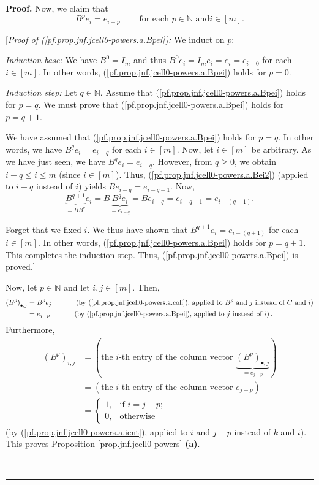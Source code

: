 \documentclass[numbers=enddot,12pt,final,onecolumn,notitlepage]{scrartcl}%
\numberwithin{exer}{subsection}
\theoremstyle{definition}
\newenvironment{proof}[1][Proof]{\noindent\textbf{#1.} }{\ \rule{0.5em}{0.5em}}
\begin{document}
\begin{proof}
Now, we claim that%
\begin{equation}
B^{p}e_{i}=e_{i-p}\ \ \ \ \ \ \ \ \ \ \text{for each }p\in\mathbb{N}\text{ and
}i\in\left[  m\right]  . \label{pf.prop.jnf.jcell0-powers.a.Bpei}%
\end{equation}


[\textit{Proof of (\ref{pf.prop.jnf.jcell0-powers.a.Bpei}):} We induct on $p$:

\textit{Induction base:} We have $B^{0}=I_{m}$ and thus $B^{0}e_{i}=I_{m}%
e_{i}=e_{i}=e_{i-0}$ for each $i\in\left[  m\right]  $. In other words,
(\ref{pf.prop.jnf.jcell0-powers.a.Bpei}) holds for $p=0$.

\textit{Induction step:} Let $q\in\mathbb{N}$. Assume that
(\ref{pf.prop.jnf.jcell0-powers.a.Bpei}) holds for $p=q$. We must prove that
(\ref{pf.prop.jnf.jcell0-powers.a.Bpei}) holds for $p=q+1$.

We have assumed that (\ref{pf.prop.jnf.jcell0-powers.a.Bpei}) holds for $p=q$.
In other words, we have $B^{q}e_{i}=e_{i-q}$ for each $i\in\left[  m\right]
$. Now, let $i\in\left[  m\right]  $ be arbitrary. As we have just seen, we
have $B^{q}e_{i}=e_{i-q}$. However, from $q\geq0$, we obtain $i-q\leq i\leq m$
(since $i\in\left[  m\right]  $). Thus,
(\ref{pf.prop.jnf.jcell0-powers.a.Bei2}) (applied to $i-q$ instead of $i$)
yields $Be_{i-q}=e_{i-q-1}$. Now,%
\[
\underbrace{B^{q+1}}_{=BB^{q}}e_{i}=B\underbrace{B^{q}e_{i}}_{=e_{i-q}%
}=Be_{i-q}=e_{i-q-1}=e_{i-\left(  q+1\right)  }.
\]


Forget that we fixed $i$. We thus have shown that $B^{q+1}e_{i}=e_{i-\left(
q+1\right)  }$ for each $i\in\left[  m\right]  $. In other words,
(\ref{pf.prop.jnf.jcell0-powers.a.Bpei}) holds for $p=q+1$. This completes the
induction step. Thus, (\ref{pf.prop.jnf.jcell0-powers.a.Bpei}) is proved.]
\medskip

Now, let $p\in\mathbb{N}$ and let $i,j\in\left[  m\right]  $. Then,%
\begin{align*}
\left(  B^{p}\right)  _{\bullet,j}  &  =B^{p}e_{j}\ \ \ \ \ \ \ \ \ \ \left(
\text{by (\ref{pf.prop.jnf.jcell0-powers.a.coli}), applied to }B^{p}\text{ and
}j\text{ instead of }C\text{ and }i\right) \\
&  =e_{j-p}\ \ \ \ \ \ \ \ \ \ \left(  \text{by
(\ref{pf.prop.jnf.jcell0-powers.a.Bpei}), applied to }j\text{ instead of
}i\right)  .
\end{align*}
Furthermore,%
\begin{align*}
\left(  B^{p}\right)  _{i,j}  &  =\left(  \text{the }i\text{-th entry of the
column vector }\underbrace{\left(  B^{p}\right)  _{\bullet,j}}_{=e_{j-p}%
}\right) \\
&  =\left(  \text{the }i\text{-th entry of the column vector }e_{j-p}\right)
\\
&  =%
\begin{cases}
1, & \text{if }i=j-p;\\
0, & \text{otherwise}%
\end{cases}
\end{align*}
(by (\ref{pf.prop.jnf.jcell0-powers.a.ient}), applied to $i$ and $j-p$ instead
of $k$ and $i$). This proves Proposition \ref{prop.jnf.jcell0-powers}
\textbf{(a)}. \medskip


\end{proof}
\end{document}
